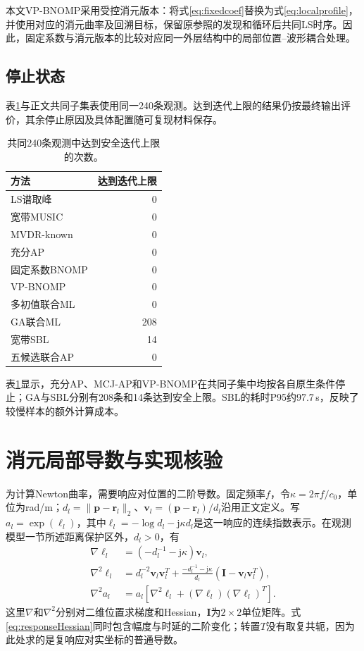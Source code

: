 \documentclass[a4paper,fleqn]{cas-sc}
\numberwithin{equation}{section}
\numberwithin{figure}{section}
\numberwithin{table}{section}
\begin{document}
本文VP-BNOMP采用受控消元版本：将式\eqref{eq:fixedcoef}替换为式\eqref{eq:localprofile}，并使用对应的消元曲率及回溯目标，保留原参照的发现和循环后共同LS时序。因此，固定系数与消元版本的比较对应同一外层结构中的局部位置--波形耦合处理。

\subsection{停止状态}
表\ref{tab:auxiliary}与正文共同子集表使用同一240条观测。达到迭代上限的结果仍按最终输出评价，其余停止原因及具体配置随可复现材料保存。

\begin{table}[pos=H]\centering\small
\caption{共同240条观测中达到安全迭代上限的次数。}\label{tab:auxiliary}
\begin{tabular}{@{}lr@{}}\toprule
方法 & 达到迭代上限\\\midrule
LS谱取峰 & 0\\
宽带MUSIC & 0\\
MVDR-known & 0\\
充分AP & 0\\
固定系数BNOMP & 0\\
VP-BNOMP & 0\\
多初值联合ML & 0\\
GA联合ML & 208\\
宽带SBL & 14\\
五候选联合AP & 0\\
\bottomrule\end{tabular}\end{table}


表\ref{tab:auxiliary}显示，充分AP、MCJ-AP和VP-BNOMP在共同子集中均按各自原生条件停止；GA与SBL分别有208条和14条达到安全上限。SBL的耗时P95约97.7\,s，反映了较慢样本的额外计算成本。

\section{消元局部导数与实现核验}\label{app:derivatives}
为计算Newton曲率，需要响应对位置的二阶导数。固定频率$f$，令$\kappa=2\pi f/c_0$，单位为rad/m；$d_l=\|\bm p-\bm r_l\|_2$、$\bm v_l=(\bm p-\bm r_l)/d_l$沿用正文定义。写$a_l=\exp(\ell_l)$，其中$\ell_l=-\log d_l-\mathrm j\kappa d_l$是这一响应的连续指数表示。在观测模型一节所述距离保护区外，$d_l>0$，有
\begin{align}
 \nabla\ell_l&=(-d_l^{-1}-\mathrm j\kappa)\bm v_l,\\
 \nabla^2\ell_l&=d_l^{-2}\bm v_l\bm v_l^T
 +\frac{-d_l^{-1}-\mathrm j\kappa}{d_l}
 (\bm I-\bm v_l\bm v_l^T),\\
 \nabla^2 a_l&=a_l[\nabla^2\ell_l+(\nabla\ell_l)(\nabla\ell_l)^T].\label{eq:responseHessian}
\end{align}
这里$\nabla$和$\nabla^2$分别对二维位置求梯度和Hessian，$\bm I$为$2\times2$单位矩阵。式\eqref{eq:responseHessian}同时包含幅度与时延的二阶变化；转置$T$没有取复共轭，因为此处求的是复响应对实坐标的普通导数。
\end{document}

